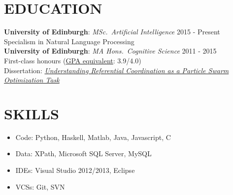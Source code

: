 \documentclass[line, margin]{res}
\newcommand{\CS}{C\nolinebreak\hspace{-.05em}\raisebox{.6ex}{\scriptsize\bf \#}}
\begin{document}
\address{130/6 Buccleuch Street, Edinburgh, Scotland EH8 9NE | +44 771 966 3016 | chase@chasestevens.com}

\begin{resume}
\section{EDUCATION}
\textbf{University of Edinburgh}: \textit{MSc.\ Artificial Intelligence} \hfill 2015 - Present\\
Specialism in Natural Language Processing \\[5pt]
\textbf{University of Edinburgh}: \textit{MA Hons.\ Cognitive Science} \hfill 2011 - 2015\\
First-class honours (\href{http://www.ed.ac.uk/schools-departments/student-administration/exams/regulations/credit-allocation}{GPA equivalent}: 3.9/4.0)\\
Dissertation: \textit{\href{http://www.chasestevens.com/papers/undergrad_dissertation.pdf}{Understanding Referential Coordination as a Particle Swarm Optimization Task}}

\section{SKILLS}
\begin{itemize}[leftmargin=10pt]
\item Code: Python, Haskell, Matlab, Java, Javascript, \CS
\item Data: XPath, Microsoft SQL Server, MySQL
\item IDEs: Visual Studio 2012/2013, Eclipse
\item VCSs: Git, SVN
\end{itemize}


\end{resume}
\end{document}
